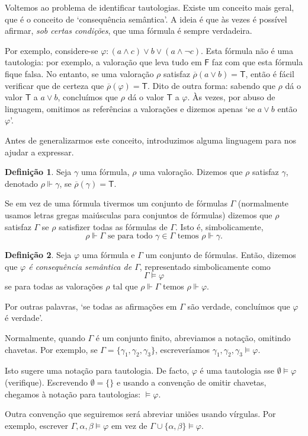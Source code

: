\documentclass{report}
\theoremstyle{definition}
\newtheorem*{definicao*}{Definição}
\theoremstyle{remark}
\newcommand{\lt}{\mathsf{T}}
\newcommand{\lf}{\mathsf{F}}
\begin{document}
	Voltemos ao problema de identificar tautologias. Existe um conceito mais geral, que é o conceito de `consequência semântica'. A ideia é que às vezes é possível afirmar, \emph{sob certas condições}, que uma fórmula é sempre verdadeira.
	
	Por exemplo, considere-se $\varphi : (a \land c) \lor b \lor (a \land \neg c)$. Esta fórmula não é uma tautologia: por exemplo, a valoração que leva tudo em $\lf$ faz com que esta fórmula fique falsa. No entanto, se uma valoração $\rho$ satisfaz $\overline\rho(a \lor b) = \lt$, então é fácil verificar que de certeza que $\overline\rho(\varphi) = \lt$. Dito de outra forma: sabendo que $\rho$ dá o valor $\lt$ a $a \lor b$, concluímos que $\rho$ dá o valor $\lt$ a $\varphi$. Às vezes, por abuso de linguagem, omitimos as referências a valorações e dizemos apenas `se $a \lor b$ então $\varphi$'.
	
	Antes de generalizarmos este conceito, introduzimos alguma linguagem para nos ajudar a expressar.
	
	\begin{definicao*}
	Seja $\gamma$ uma fórmula, $\rho$ uma valoração. Dizemos que $\rho$ satisfaz $\gamma$, denotado $\rho \Vdash \gamma$, se $\overline\rho(\gamma) = \lt$.
	
	Se em vez de uma fórmula tivermos um conjunto de fórmulas $\Gamma$ (normalmente usamos letras gregas maiúsculas para conjuntos de fórmulas) dizemos que $\rho$ satisfaz $\Gamma$ se $\rho$ satisfizer todas as fórmulas de $\Gamma$. Isto é, simbolicamente,
	\[\rho \Vdash \Gamma \text{ se para todo $\gamma \in \Gamma$ temos } \rho \Vdash \gamma.\]
	\end{definicao*}
	
	\begin{definicao*}
	Seja $\varphi$ uma fórmula e $\Gamma$ um conjunto de fórmulas. Então, dizemos que \emph{$\varphi$ é consequência semântica de $\Gamma$}, representado simbolicamente como
	\[\Gamma \vDash \varphi\]
	se para todas as valorações $\rho$ tal que $\rho \Vdash \Gamma$ temos $\rho \Vdash \varphi$.
	
	Por outras palavras, `se todas as afirmações em $\Gamma$ são verdade, concluímos que $\varphi$ é verdade'.
	
	Normalmente, quando $\Gamma$ é um conjunto finito, abreviamos a notação, omitindo chavetas. Por exemplo, se $\Gamma = \{\gamma_1, \gamma_2, \gamma_3\}$, escreveríamos $\gamma_1, \gamma_2, \gamma_3 \vDash \varphi$.\label{convencao:consequencia}
	
	Isto sugere uma notação para tautologia. De facto, $\varphi$ é uma tautologia sse $\emptyset \vDash \varphi$ (verifique). Escrevendo $\emptyset = \{\}$ e usando a convenção de omitir chavetas, chegamos à notação para tautologias: $\vDash \varphi$.
	
	Outra convenção que seguiremos será abreviar uniões usando vírgulas. Por exemplo, escrever $\Gamma, \alpha, \beta \vDash \varphi$ em vez de $\Gamma \cup \{\alpha, \beta\} \vDash \varphi$.
	\end{definicao*}
	
\end{document}
